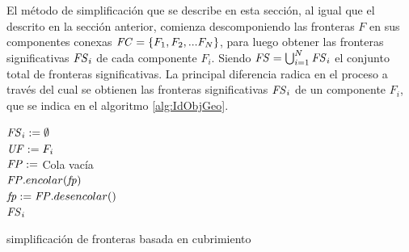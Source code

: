 El método de simplificación que se describe en esta sección, al igual que el
descrito en la sección anterior, comienza descomponiendo las fronteras $F$ en
sus componentes conexas $\mathit{FC}=\{F_1,F_2,...F_N\}$, para luego obtener las
fronteras significativas $\mathit{FS}_i$ de cada componente $F_i$. Siendo
$\mathit{FS} = \bigcup^N_{i=1} \mathit{FS}_i$ el conjunto total de fronteras
significativas. La principal diferencia radica en el proceso a través del cual
se obtienen las fronteras significativas $\mathit{FS}_i$ de un componente $F_i$, que
se indica en el algoritmo \ref{alg:IdObjGeo}.

\begin{algorithm}[H]
\SetAlgoLined

  $\mathit{FS}_i := \emptyset$\\
  $\mathit{UF} := F_i$ \\

  $\mathit{FP} :=$ Cola vacía \\
   {
    $\mathit{FP}.encolar(\mathit{fp})$\\
  }
   {
    $\mathit{fp} := \mathit{FP}.desencolar()$\\
  }
  \Return $\mathit{FS}_i$ 

  \caption{simplificación de fronteras basada en cubrimiento}
  \label{alg:IdObjGeo}
\end{algorithm}

